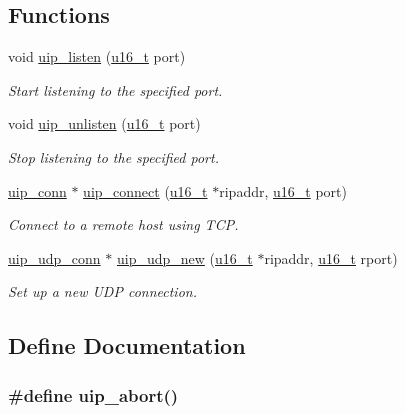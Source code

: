 \subsection*{Functions}
\begin{CompactItemize}
\item 
void \hyperlink{a00064_gdd1ab3704ecd4900eec61a6897d32dc8}{uip\_\-listen} (\hyperlink{a00070_gfc6499c1f28697aa3bfc2804d496fd11}{u16\_\-t} port)
\begin{CompactList}\small\item\em Start listening to the specified port. \item\end{CompactList}\item 
void \hyperlink{a00064_gaa585784b0914cac1d37f07f85457008}{uip\_\-unlisten} (\hyperlink{a00070_gfc6499c1f28697aa3bfc2804d496fd11}{u16\_\-t} port)
\begin{CompactList}\small\item\em Stop listening to the specified port. \item\end{CompactList}\item 
\hyperlink{a00028}{uip\_\-conn} $\ast$ \hyperlink{a00064_gce715881b240922bba96613c2a88fd67}{uip\_\-connect} (\hyperlink{a00070_gfc6499c1f28697aa3bfc2804d496fd11}{u16\_\-t} $\ast$ripaddr, \hyperlink{a00070_gfc6499c1f28697aa3bfc2804d496fd11}{u16\_\-t} port)
\begin{CompactList}\small\item\em Connect to a remote host using TCP. \item\end{CompactList}\item 
\hyperlink{a00032}{uip\_\-udp\_\-conn} $\ast$ \hyperlink{a00064_g527ff0e535266167077b06d3a4742822}{uip\_\-udp\_\-new} (\hyperlink{a00070_gfc6499c1f28697aa3bfc2804d496fd11}{u16\_\-t} $\ast$ripaddr, \hyperlink{a00070_gfc6499c1f28697aa3bfc2804d496fd11}{u16\_\-t} rport)
\begin{CompactList}\small\item\em Set up a new UDP connection. \item\end{CompactList}\end{CompactItemize}


\subsection{Define Documentation}
\hypertarget{a00064_g88d2ccf7cd821f89d9a8df7e3948b56c}{
\subsubsection[uip\_\-abort]{\setlength{\rightskip}{0pt plus 5cm}\#define uip\_\-abort()}}
\label{a00064_g88d2ccf7cd821f89d9a8df7e3948b56c}


